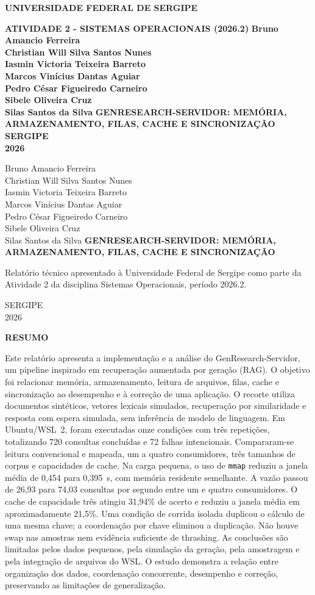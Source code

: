 \documentclass[12pt,a4paper]{article}
\newcommand{\titulotrabalho}{GENRESEARCH-SERVIDOR: MEMÓRIA, ARMAZENAMENTO, FILAS, CACHE E SINCRONIZAÇÃO}
\newcommand{\integrantes}{Bruno Amancio Ferreira\\Christian Will Silva Santos Nunes\\Iasmin Victoria Teixeira Barreto\\Marcos Vinícius Dantas Aguiar\\Pedro César Figueiredo Carneiro\\Sibele Oliveira Cruz\\Silas Santos da Silva}
\begin{document}
  \hypersetup{pageanchor=false}
  \begin{titlepage}
  \thispagestyle{empty}
  \begin{center}
  \textbf{UNIVERSIDADE FEDERAL DE SERGIPE}
  \vspace{1.2cm}
  
  \textbf{ATIVIDADE 2 - SISTEMAS OPERACIONAIS (2026.2)}
  \vfill
  {\bfseries\integrantes}
  \vfill
  {\large\textbf{\titulotrabalho}}
  \vfill
  \textbf{SERGIPE}\\\textbf{2026}
  \end{center}
  \end{titlepage}
  
  \begin{titlepage}
  \thispagestyle{empty}
  \begin{center}
  \integrantes
  \vfill
  {\large\textbf{\titulotrabalho}}
  \vfill
  \begin{flushright}
  \begin{minipage}{0.55\textwidth}
  Relatório técnico apresentado à Universidade Federal de Sergipe como parte da Atividade 2 da disciplina Sistemas Operacionais, período 2026.2.
  \end{minipage}
  \end{flushright}
  \vfill
  SERGIPE\\2026
  \end{center}
  \end{titlepage}
  
  \hypersetup{pageanchor=true}
  \thispagestyle{empty}
  \begin{center}\textbf{RESUMO}\end{center}
  Este relatório apresenta a implementação e a análise do GenResearch-Servidor, um pipeline inspirado em recuperação aumentada por geração (RAG). O objetivo foi relacionar memória, armazenamento, leitura de arquivos, filas, cache e sincronização ao desempenho e à correção de uma aplicação. O recorte utiliza documentos sintéticos, vetores lexicais simulados, recuperação por similaridade e resposta com espera simulada, sem inferência de modelo de linguagem. Em Ubuntu/WSL~2, foram executadas onze condições com três repetições, totalizando 720 consultas concluídas e 72 falhas intencionais. Compararam-se leitura convencional e mapeada, um a quatro consumidores, três tamanhos de corpus e capacidades de cache. Na carga pequena, o uso de \texttt{mmap} reduziu a janela média de 0,454 para 0,395~s, com memória residente semelhante. A vazão passou de 26,93 para 74,03 consultas por segundo entre um e quatro consumidores. O cache de capacidade três atingiu 31,94\% de acerto e reduziu a janela média em aproximadamente 21,5\%. Uma condição de corrida isolada duplicou o cálculo de uma mesma chave; a coordenação por chave eliminou a duplicação. Não houve swap nas amostras nem evidência suficiente de thrashing. As conclusões são limitadas pelos dados pequenos, pela simulação da geração, pela amostragem e pela integração de arquivos do WSL. O estudo demonstra a relação entre organização dos dados, coordenação concorrente, desempenho e correção, preservando as limitações de generalização.
  
\end{document}
